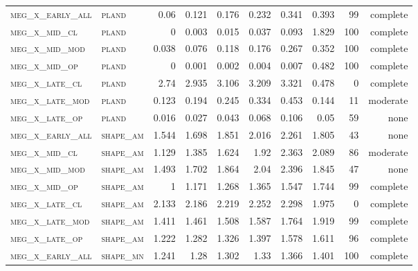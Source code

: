 \begin{landscape}
\begin{center}
\begin{footnotesize}
\begin{longtable}{llrrrrr|rrr}
\textsc{meg\_x\_early\_all} & \textsc{pland     }    & 0.06     & 0.121    & 0.176    & 0.232    & 0.341    & 0.393    & 99  & complete \\
\textsc{meg\_x\_mid\_cl   } & \textsc{pland     }    & 0        & 0.003    & 0.015    & 0.037    & 0.093    & 1.829    & 100 & complete \\
\textsc{meg\_x\_mid\_mod  } & \textsc{pland     }    & 0.038    & 0.076    & 0.118    & 0.176    & 0.267    & 0.352    & 100 & complete \\
\textsc{meg\_x\_mid\_op   } & \textsc{pland     }    & 0        & 0.001    & 0.002    & 0.004    & 0.007    & 0.482    & 100 & complete \\
\textsc{meg\_x\_late\_cl  } & \textsc{pland     }    & 2.74     & 2.935    & 3.106    & 3.209    & 3.321    & 0.478    & 0   & complete \\
\textsc{meg\_x\_late\_mod } & \textsc{pland     }    & 0.123    & 0.194    & 0.245    & 0.334    & 0.453    & 0.144    & 11  & moderate \\
\textsc{meg\_x\_late\_op  } & \textsc{pland     }    & 0.016    & 0.027    & 0.043    & 0.068    & 0.106    & 0.05     & 59  & none     \\
\textsc{meg\_x\_early\_all} & \textsc{shape\_am }    & 1.544    & 1.698    & 1.851    & 2.016    & 2.261    & 1.805    & 43  & none     \\
\textsc{meg\_x\_mid\_cl   } & \textsc{shape\_am }    & 1.129    & 1.385    & 1.624    & 1.92     & 2.363    & 2.089    & 86  & moderate \\
\textsc{meg\_x\_mid\_mod  } & \textsc{shape\_am }    & 1.493    & 1.702    & 1.864    & 2.04     & 2.396    & 1.845    & 47  & none     \\
\textsc{meg\_x\_mid\_op   } & \textsc{shape\_am }    & 1        & 1.171    & 1.268    & 1.365    & 1.547    & 1.744    & 99  & complete \\
\textsc{meg\_x\_late\_cl  } & \textsc{shape\_am }    & 2.133    & 2.186    & 2.219    & 2.252    & 2.298    & 1.975    & 0   & complete \\
\textsc{meg\_x\_late\_mod } & \textsc{shape\_am }    & 1.411    & 1.461    & 1.508    & 1.587    & 1.764    & 1.919    & 99  & complete \\
\textsc{meg\_x\_late\_op  } & \textsc{shape\_am }    & 1.222    & 1.282    & 1.326    & 1.397    & 1.578    & 1.611    & 96  & complete \\
\textsc{meg\_x\_early\_all} & \textsc{shape\_mn }    & 1.241    & 1.28     & 1.302    & 1.33     & 1.366    & 1.401    & 100 & complete \\

\end{longtable}
\end{footnotesize}
\end{center}
\end{landscape}
